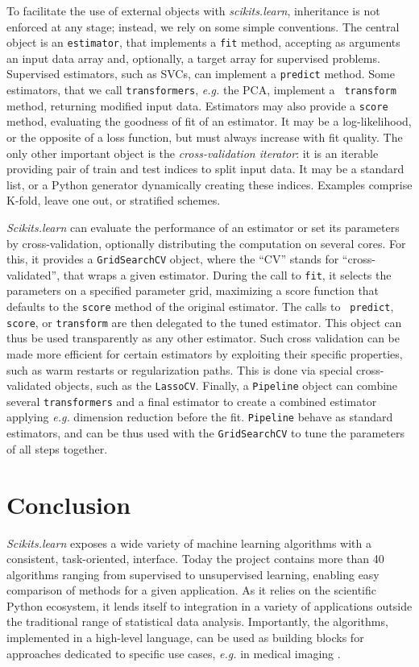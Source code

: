 \documentclass[twoside,11pt]{article}
\begin{document}
%
To facilitate the use of external objects with \emph{scikits.learn},
inheritance is not enforced at any stage; instead, we rely on some simple
conventions. The central object is an {\tt estimator}, that implements a
{\tt fit} method, accepting as arguments an input data array and,
optionally, a target array for supervised problems. Supervised estimators,
such as SVCs, can implement a {\tt predict} method. Some estimators,
that we call {\tt transformers}, \emph{e.g.} the PCA, implement a {\tt
transform} method, returning modified input data.
%
Estimators may also provide a {\tt score} method, evaluating the goodness
of fit of an estimator. It may be a log-likelihood, or the opposite of a
loss function, but must always increase with fit quality.
%
The only other important object is the \emph{cross-validation iterator}:
it is an iterable providing pair of train and test indices to split input
data. It may be a standard list, or a Python generator dynamically
creating these indices. Examples comprise K-fold, leave one out, or
stratified schemes. 


\smallskip {}
%
\emph{Scikits.learn} can evaluate the performance of an estimator or set
its parameters by cross-validation, optionally distributing the
computation on several cores. For this, it provides a {\tt GridSearchCV}
object, where the ``CV'' stands for ``cross-validated'', that wraps a
given estimator. During the call to {\tt fit}, it selects the parameters
on a specified parameter grid, maximizing a score function that defaults
to the {\tt score} method of the original estimator. The calls to {\tt
predict}, {\tt score}, or {\tt transform} are then delegated to the tuned
estimator. This object can thus be used transparently as any other
estimator. Such cross validation can be made more efficient for certain
estimators by exploiting their specific properties, such as warm restarts
or regularization paths. This is done via special cross-validated
objects, such as the {\tt LassoCV}. Finally, a {\tt Pipeline} object can
combine several {\tt transformers} and a final estimator to create a
combined estimator applying \emph{e.g.} dimension reduction before the
fit. {\tt Pipeline} behave as standard estimators, and can be thus used
with the {\tt GridSearchCV} to tune the parameters of all steps together.

\section{Conclusion}

\emph{Scikits.learn} exposes a wide variety of machine learning
algorithms with a consistent, task-oriented, interface. Today the project
contains more than 40 algorithms ranging from supervised to unsupervised
learning, enabling easy comparison of methods for a given application.
%
As it relies on the scientific Python ecosystem, it lends itself to
integration in a variety of applications outside the traditional range of
statistical data analysis. Importantly, the algorithms, implemented in a
high-level language, can be used as building blocks for approaches
dedicated to specific use cases, \emph{e.g.} in medical imaging
\citep{Michel2011}.


\end{document}
